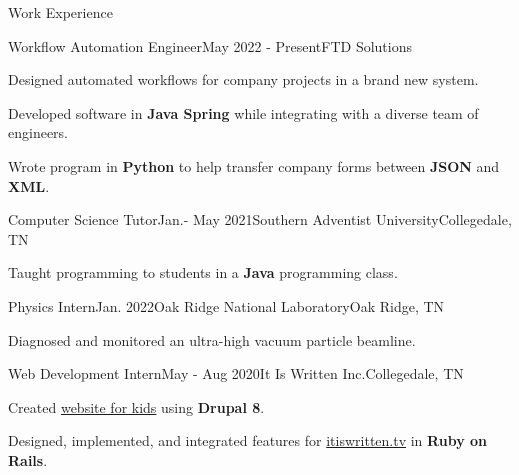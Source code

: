 \begin{rSection}{Work Experience}
	\begin{job}{Workflow Automation Engineer}{May 2022 - Present}{FTD Solutions}{}
		\item Designed automated workflows for company projects in a brand new system.
		\item Developed software in {\bf Java Spring} while integrating with a diverse team of engineers.
		\item Wrote program in {\bf Python} to help transfer company forms between {\bf JSON} and {\bf XML}.
	\end{job}
	
	\begin{job}{Computer Science Tutor}{Jan.- May 2021}{Southern Adventist University}{Collegedale, TN}{}
	 \item Taught programming to students in a {\bf Java} programming class.
	\end{job}

	\begin{job}{Physics Intern}{Jan. 2022}{Oak Ridge National Laboratory}{Oak Ridge, TN}
	 \item Diagnosed and monitored an ultra-high vacuum particle beamline.
	\end{job}

	\begin{job}{Web Development Intern}{May - Aug 2020}{It Is Written Inc.}{Collegedale, TN}
		\item Created \href{https://buriedtreasure.fun/}{website for kids} using {\bf Drupal 8}.
		\item Designed, implemented, and integrated features for \href{https://itiswritten.tv}{itiswritten.tv} in {\bf Ruby on Rails}.
	\end{job}
\end{rSection}
